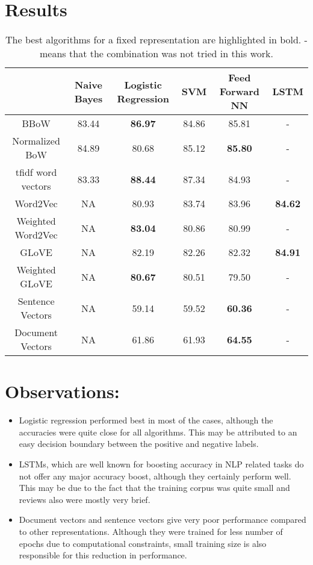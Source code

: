 \documentclass{article}
\begin{document}
\section{Results}
\begin{table}[h!]
    \begin{tabular}{|c|c|c|c|c|c|}
        \hline
        ~                  & Naive Bayes & Logistic Regression & SVM   & Feed Forward NN & LSTM \\ \hline
        BBoW               & 83.44       & \textbf{86.97}      & 84.86 & 85.81           & -    \\ 
        Normalized BoW     & 84.89       & 80.68               & 85.12 & \textbf{85.80}  & -    \\ 
        tfidf word vectors & 83.33       & \textbf{88.44}      & 87.34 & 84.93           & -    \\ 
        Word2Vec           & NA          & 80.93               & 83.74 & 83.96           &  \textbf{84.62}    \\ 
        Weighted Word2Vec  & NA          & \textbf{83.04}      & 80.86 & 80.99           & -    \\ 
        GLoVE              & NA          & 82.19               & 82.26 & 82.32           &  \textbf{84.91}    \\ 
        Weighted GLoVE     & NA          & \textbf{80.67}      & 80.51 & 79.50           & -    \\ 
        Sentence Vectors   & NA          & 59.14               & 59.52 & \textbf{60.36}  & -    \\ 
        Document Vectors   & NA          & 61.86               & 61.93 & \textbf{64.55}  & -    \\
        \hline
    \end{tabular}
	\caption{The best algorithms for a fixed representation are highlighted in bold. - means that the combination was not tried in this work.}
\end{table}

\section{Observations:}
\begin{itemize}
	\item Logistic regression performed best in most of the cases, although the accuracies were quite close for all algorithms. This may be attributed to an easy decision boundary between the positive and negative labels.
	\item LSTMs, which are well known for boosting accuracy in NLP related tasks do not offer any major accuracy boost, although they certainly perform well. This may be due to the fact that the training corpus was quite small and reviews also were mostly very brief.
	\item Document vectors and sentence vectors give very poor performance compared to other representations. Although they were trained for less number of epochs due to computational constraints, small training size is also responsible for this reduction in performance.
\end{itemize}
\end{document}
